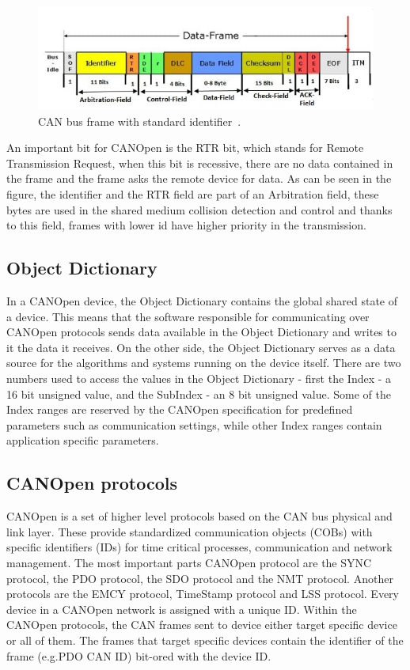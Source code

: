 \begin{figure}[H]
    \centering
    \includegraphics[width=\textwidth]{obrazky/can_frame}
    \caption{CAN bus frame with standard identifier~\cite{piembsystech}.}
    \label{fig:can_frame}
\end{figure}

An important bit for CANOpen is the RTR bit, which stands for Remote Transmission Request, when this bit is recessive, there are no data contained in the frame and the frame asks the remote device for data.
As can be seen in the figure, the identifier and the RTR field are part of an Arbitration field, these bytes are used in the shared medium collision detection and control and thanks to this field, frames with lower id have higher priority in the transmission.

\subsection{Object Dictionary}
\label{subsec:object_dictionary}
In a CANOpen device, the Object Dictionary contains the global shared state of a device.
This means that the software responsible for communicating over CANOpen protocols sends data available in the Object Dictionary and writes to it the data it receives.
On the other side, the Object Dictionary serves as a data source for the algorithms and systems running on the device itself.
There are two numbers used to access the values in the Object Dictionary - first the Index - a 16 bit unsigned value, and the SubIndex - an 8 bit unsigned value.
Some of the Index ranges are reserved by the CANOpen specification for predefined parameters such as communication settings, while other Index ranges contain application specific parameters\cite{cia}.

\subsection{CANOpen protocols}
\label{subsec:canopen_proto}
CANOpen is a set of higher level protocols based on the CAN bus physical and link layer.
These provide standardized communication objects (COBs) with specific identifiers (IDs) for time critical processes, communication and network management\cite{cia}.
The most important parts CANOpen protocol are the SYNC protocol, the PDO protocol, the SDO protocol and the NMT protocol.
Another protocols are the EMCY protocol, TimeStamp protocol and LSS protocol.
Every device in a CANOpen network is assigned with a unique ID.
Within the CANOpen protocols, the CAN frames sent to device either target specific device or all of them.
The frames that target specific devices contain the identifier of the frame (e.g.PDO CAN ID) bit-ored with the device ID.

